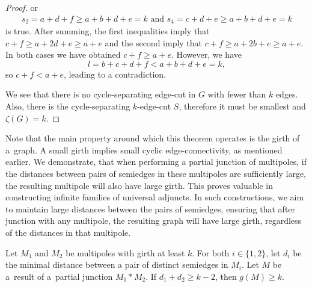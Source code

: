 \documentclass[12pt, twoside]{book}
\begin{document}
\begin{proof}
	or
	\begin{align*}
		s_2 =a+d+f \geq a+b+d+e=k \text{ and } s_4 =c+d+e\geq a+b+d+e=k
	\end{align*}
	is true. After summing, the first inequalities imply that $c+f\geq a+2d+e\geq a+e$ and the second imply that $c+f\geq a+2b+e\geq a+e$. In both cases we have obtained $c+f\geq a+e$. However, we have 
	$$l=b+c+d+f<a+b+d+e=k,$$
	so $c+f<a+e$, leading to a contradiction.
	
	We see that there is no cycle-separating edge-cut in $G$ with fewer than $k$ edges. Also, there is the \mbox{cycle-separating} $k$-edge-cut $S$, therefore it must be smallest and $\zeta(G)=k$.
\end{proof}

Note that the main property around which this theorem operates is the girth of a~graph. A small girth implies small cyclic edge-connectivity, as mentioned earlier. We demonstrate, that when performing a partial junction of multipoles, if the distances between pairs of semiedges in these multipoles are sufficiently large, the resulting multipole will also have large girth. This proves valuable in constructing infinite families of universal adjuncts. In such constructions, we aim to maintain large distances between the pairs of semiedges, ensuring that after junction with any multipole, the resulting graph will have large girth, regardless of the distances in that multipole.

\begin{lemma}\label{lem:cyclic-multipoles-with-girth-and-distance}
	Let $M_1$ and $M_2$ be multipoles with girth at least $k$. For both $i\in\{1,2\}$, let $d_i$ be the minimal distance between a pair of distinct semiedges in $M_i$. Let $M$ be a~result of a~partial junction $M_1*M_2$. If $d_1+d_2\geq k-2$, then $g(M)\geq k$.
\end{lemma}
\end{document}
